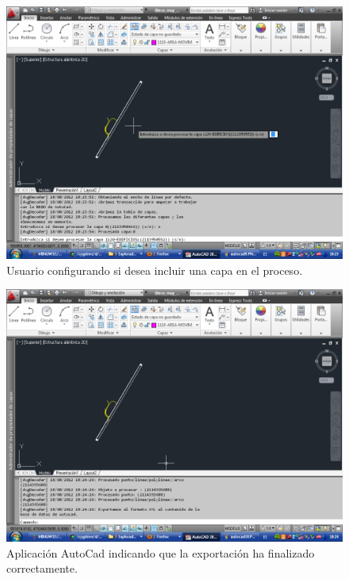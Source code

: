 \begin{figure}[h]
\begin{center}
\includegraphics[width=\textwidth]{imgs/autocad10}
\caption{Usuario configurando si desea incluir una capa en el proceso.}
\end{center}
\end{figure}

\begin{figure}[h]
\begin{center}
\includegraphics[width=\textwidth]{imgs/autocad11}
\caption{Aplicación AutoCad indicando que la exportación ha finalizado correctamente.}
\end{center}
\end{figure}


